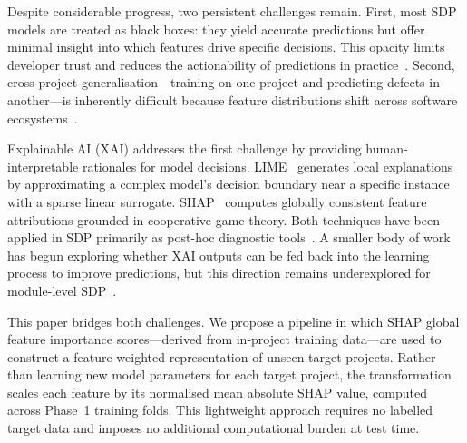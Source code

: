 \documentclass[12pt, a4paper]{article}
\begin{document}
Despite considerable progress, two persistent challenges remain. First, most
SDP models are treated as black boxes: they yield accurate predictions but
offer minimal insight into which features drive specific decisions. This
opacity limits developer trust and reduces the actionability of predictions in
practice~\cite{molnar2023,giray2023}. Second, cross-project
generalisation---training on one project and predicting defects in
another---is inherently difficult because feature distributions shift across
software ecosystems~\cite{kamei2017,jureczko2015}.

Explainable AI (XAI) addresses the first challenge by providing
human-interpretable rationales for model decisions.
LIME~\cite{ribeiro2016} generates local explanations by approximating a
complex model's decision boundary near a specific instance with a sparse
linear surrogate. SHAP~\cite{lundberg2017} computes globally consistent
feature attributions grounded in cooperative game theory. Both techniques
have been applied in SDP primarily as post-hoc diagnostic
tools~\cite{shin2021,haldar2023,zheng2022}. A smaller body of work has
begun exploring whether XAI outputs can be fed back into the learning
process to improve predictions, but this direction remains underexplored for
module-level SDP~\cite{schulte2024,alsmadi2023}.

This paper bridges both challenges. We propose a pipeline in which SHAP
global feature importance scores---derived from in-project training data---are
used to construct a feature-weighted representation of unseen target projects.
Rather than learning new model parameters for each target project, the
transformation scales each feature by its normalised mean absolute SHAP value,
computed across Phase~1 training folds. This lightweight approach requires no
labelled target data and imposes no additional computational burden at test
time.
\end{document}
